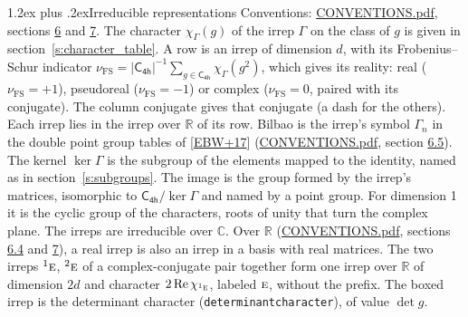 \documentclass[10pt,a4paper]{article}
\makeatletter
\renewcommand\section{\@startsection{section}{1}{\z@}{-3ex plus -1ex minus -.2ex}%
  {1.2ex plus .2ex}{\normalfont\large\sffamily\bfseries\color{parttitle}}}
\numberwithin{equation}{section}
\newcommand{\grp}[1]{\mathsf{#1}}
\newcommand{\irr}[1]{\text{\normalfont\scshape #1}}
\newcommand{\conjpair}[1]{{}^{#1}}
\newcommand{\irchar}[1]{\chi_{#1}}
\newcommand{\fsind}{\nu_{\mathrm{FS}}}
\makeatother
\begin{document}
\section{Irreducible representations}\label{s:irreps}
Conventions: \href{../../CONVENTIONS.pdf}{CONVENTIONS.pdf}, sections \href{../../CONVENTIONS.pdf\#conv.6}{6} and \href{../../CONVENTIONS.pdf\#conv.7}{7}.
\leavevmode\label{n:function.character}\label{n:irrep.Gamma}The character $\irchar{\Gamma}(g)$ of the irrep $\Gamma$ on the class of $g$ is given in section~\ref{s:character_table}.
\leavevmode\label{n:index.dimension}\label{n:index.frobenius}\label{n:head.irrep}\label{n:head.reality}A row is an irrep of dimension $d$, with its Frobenius--Schur indicator $\fsind = |\grp{C_{4h}}|^{-1}\allowbreak\sum_{g\in\grp{C_{4h}}}\irchar{\Gamma}(g^2)$, which gives its reality: real ($\fsind = +1$), pseudoreal ($\fsind = -1$) or complex ($\fsind = 0$, paired with its conjugate). \label{n:head.conjugate}The column conjugate gives that conjugate (a dash for the others). \label{n:head.over.real}Each irrep lies in the irrep over $\mathbb{R}$ of its row. \label{n:head.bilbao}\label{n:irrep.alias.gamma}Bilbao is the irrep's symbol $\Gamma_n$ in the double point group tables of [\href{../../../REFERENCES.pdf\#ref.EBW+17}{EBW+17}] (\href{../../CONVENTIONS.pdf}{CONVENTIONS.pdf}, section \href{../../CONVENTIONS.pdf\#conv.6.5}{6.5}). \label{n:head.kernel}The kernel $\ker\Gamma$ is the subgroup of the elements mapped to the identity, named as in section~\ref{s:subgroups}. \label{n:head.image}The image is the group formed by the irrep's matrices, isomorphic to $\grp{C_{4h}}/\ker\Gamma$ and named by a point group. For dimension 1 it is the cyclic group of the characters, roots of unity that turn the complex plane. The irreps are irreducible over $\mathbb{C}$. Over $\mathbb{R}$ (\href{../../CONVENTIONS.pdf}{CONVENTIONS.pdf}, sections \href{../../CONVENTIONS.pdf\#conv.6.4}{6.4} and \href{../../CONVENTIONS.pdf\#conv.7}{7}), a real irrep is also an irrep in a basis with real matrices. The two irreps $\conjpair{1}\irr{e}$, $\conjpair{2}\irr{e}$ of a complex-conjugate pair together form one irrep over $\mathbb{R}$ of dimension $2d$ and character $2\operatorname{Re}\irchar{\conjpair{1}\irr{e}}$, labeled $\irr{e}$, without the prefix. \label{n:mark.determinant}The boxed irrep is the determinant character (\texttt{determinantcharacter}), of value $\det g$.
\setlength{\emergencystretch}{2em}\par\setlength{\emergencystretch}{0pt}
\end{document}
